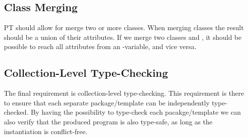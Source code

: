 \subsection{Class Merging}\label{subsec:class-merging}

PT should allow for merge two or more classes.
When merging classes the result should be a union of their attributes.
If we merge two classes  and , it should be possible to reach all  attributes from an -variable, and vice versa.

%

\subsection{Collection-Level Type-Checking}\label{subsec:collection-level-type-checking}

The final requirement is collection-level type-checking.
This requirement is there to ensure that each separate package/template can be independently type-checked.
By having the possibility to type-check each pacakge/template we can also verify that the produced program is also type-safe, as long as the instantiation is conflict-free.

